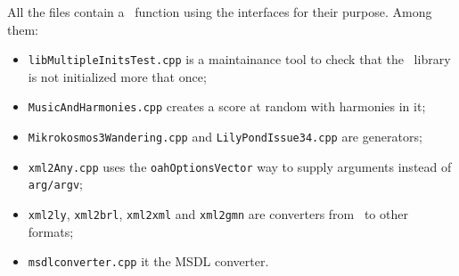 All the  files contain a \mainFunction\ function using the interfaces for their purpose. Among them:
\begin{itemize}
\item {\tt libMultipleInitsTest.cpp} is a maintainance tool to check that the \mf\ library is not initialized more that once;
\item {\tt MusicAndHarmonies.cpp} creates a score at random with harmonies in it;
\item {\tt Mikrokosmos3Wandering.cpp} and {\tt LilyPondIssue34.cpp} are generators;
\item {\tt xml2Any.cpp} uses the {\tt oahOptionsVector} way to supply arguments instead of {\tt arg/argv};
\item {\tt xml2ly}, {\tt xml2brl}, {\tt xml2xml} and {\tt xml2gmn} are converters from \mxml\ to other formats;
\item {\tt msdlconverter.cpp} it the MSDL converter.
\end{itemize}
